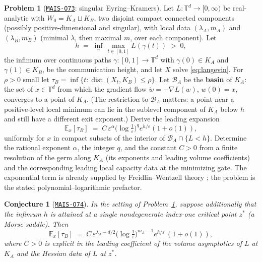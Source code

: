 \documentclass[11pt]{amsart}
\newcommand{\Oid}[1]{\href{https://github.com/lionellevine/MAIS/blob/main/open-problems/MAIS-O#1.md}{\texttt{MAIS-O#1}}}
\theoremstyle{plain}
\newtheorem{conjecture}[theorem]{Conjecture}
\theoremstyle{definition}
\newtheorem{problem}[theorem]{Problem}
\newcommand{\E}{\mathbb{E}}
\newcommand{\T}{\mathbb{T}}
\newcommand{\dist}{\operatorname{dist}}
\begin{document}
\begin{problem}[\Oid{73}: singular Eyring--Kramers]\label{prob:kramers}
Let $L\colon \T^d \to [0,\infty)$ be real-analytic with $W_0 = K_A \sqcup K_B$, two disjoint compact connected components (possibly positive-dimensional and singular), with local data $(\lambda_A, m_A)$ and $(\lambda_B, m_B)$ (minimal $\lambda$, then maximal $m$, over each component). Let
\[
   h \;=\; \inf_{\gamma} \, \max_{t \in [0,1]} L(\gamma(t)) \;>\; 0,
\]
the infimum over continuous paths $\gamma\colon [0,1] \to \T^d$ with $\gamma(0) \in K_A$ and $\gamma(1) \in K_B$, be the communication height, and let $X$ solve \eqref{eq:langevin}. For $\rho > 0$ small let $\tau_B = \inf \{ t : \dist(X_t, K_B) \le \rho \}$. Let $\mathcal{B}_A$ be the \textbf{basin} of $K_A$: the set of $x \in \T^d$ from which the gradient flow $\dot w = -\nabla L(w)$, $w(0) = x$, converges to a point of $K_A$. (The restriction to $\mathcal B_A$ matters: a point near a positive-level local minimum can lie in the sublevel component of $K_A$ below $h$ and still have a different exit exponent.) Derive the leading expansion
\[
   \E_x[\tau_B]
   \;=\;
   C\,\varepsilon^\alpha
   \bigl(\log\tfrac1\varepsilon\bigr)^q
   e^{h/\varepsilon}(1+o(1)),
\]
uniformly for $x$ in compact subsets of the interior of $\mathcal{B}_A \cap \{ L < h \}$. Determine the rational exponent $\alpha$, the integer $q$, and the constant $C>0$ from a finite resolution of the germ along $K_A$ (its exponents and leading volume coefficients) and the corresponding leading local capacity data at the minimizing gate. The exponential term is already supplied by Freidlin--Wentzell theory \cite{freidlin2012}; the problem is the stated polynomial--logarithmic prefactor.
\end{problem}

\begin{conjecture}[\Oid{74}]\label{conj:kramers}
In the setting of Problem~\ref{prob:kramers}, suppose additionally that the infimum $h$ is attained at a single nondegenerate index-one critical point $z^*$ (a Morse saddle). Then
\[
   \E_x[\tau_B] \;=\; C\, \varepsilon^{\lambda_A - d/2} \bigl( \log \tfrac1\varepsilon \bigr)^{m_A - 1} e^{h/\varepsilon} \, (1 + o(1)),
\]
where $C > 0$ is explicit in the leading coefficient of the volume asymptotics of $L$ at $K_A$ and the Hessian data of $L$ at $z^*$.
\end{conjecture}
\end{document}
